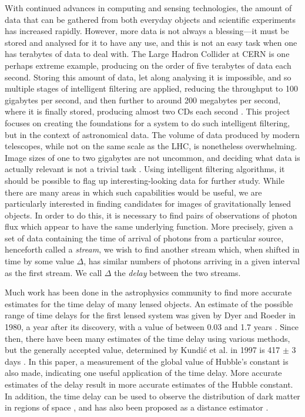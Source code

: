 \documentclass[a4paper,11pt]{article}
\begin{document}
  With continued advances in computing and sensing technologies, the amount of
  data that can be gathered from both everyday objects and scientific experiments
  has increased rapidly. However, more data is not always a blessing---it must be
  stored and analysed for it to have any use, and this is not an easy task when
  one has terabytes of data to deal with. The Large Hadron Collider at CERN is one
  perhaps extreme example, producing on the order of five terabytes of data each
  second. Storing this amount of data, let along analysing it is impossible, and
  so multiple stages of intelligent filtering are applied, reducing the throughput
  to 100 gigabytes per second, and then further to around 200 megabytes per
  second, where it is finally stored, producing almost two CDs each second
  \cite{WLCGproc}. This project focuses on creating the foundations for a system
  to do such intelligent filtering, but in the context of astronomical data. The
  volume of data produced by modern telescopes, while not on the same scale as the
  LHC, is nonetheless overwhelming. Image sizes of one to two gigabytes are not
  uncommon, and deciding what data is actually relevant is not a trivial task
  \cite{starck2002handbook}. Using intelligent filtering algorithms, it should be
  possible to flag up interesting-looking data for further study. While there are
  many areas in which such capabilities would be useful, we are particularly
  interested in finding candidates for images of gravitationally lensed
  objects. In order to do this, it is necessary to find pairs of observations of
  photon flux which appear to have the same underlying function. More precisely,
  given a set of data containing the time of arrival of photons from a particular
  source, henceforth called a \emph{stream}, we wish to find another stream which,
  when shifted in time by some value $\Delta$, has similar numbers of photons
  arriving in a given interval as the first stream. We call $\Delta$ the
  \emph{delay} between the two streams.

  Much work has been done in the astrophysics community to find more accurate
  estimates for the time delay of many lensed objects. An estimate of the possible
  range of time delays for the first lensed system was given by Dyer and Roeder in
  1980, a year after its discovery, with a value of between 0.03 and 1.7 years
  \cite{dyer1980range}. Since then, there have been many estimates of the time
  delay using various methods, but the generally accepted value, determined by
  Kundi\'c et al. in 1997 is 417 $\pm$ 3 days \cite{kundic1997robust}. In this
  paper, a measurement of the global value of Hubble's constant is also made,
  indicating one useful application of the time delay. More accurate estimates of
  the delay result in more accurate estimates of the Hubble constant. In addition,
  the time delay can be used to observe the distribution of dark matter in regions
  of space \cite{schneider2006gravitational}, and has also been proposed as a
  distance estimator \cite{bozza2004time}.
\end{document}
